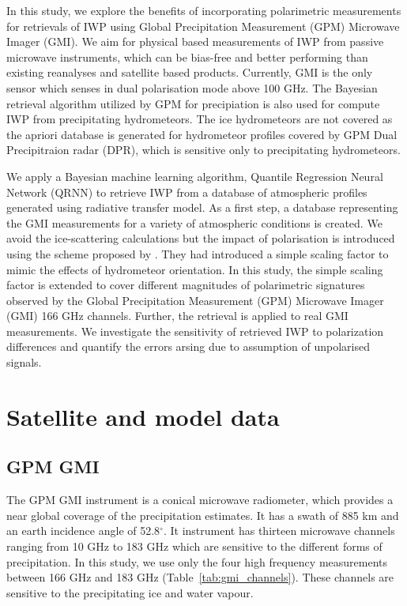 \documentclass[amt, manuscript]{copernicus}
\begin{document}
In this study, we explore the benefits of incorporating polarimetric measurements for retrievals of IWP using Global Precipitation Measurement (GPM) Microwave Imager (GMI). We aim for physical based measurements of IWP from passive microwave instruments, which can be bias-free and better performing than existing reanalyses and satellite based products. Currently, GMI is the only sensor which senses in dual polarisation mode above 100\,\,GHz. The Bayesian retrieval algorithm utilized by GPM for precipiation is also used for compute IWP from precipitating hydrometeors. The ice hydrometeors are not covered as the apriori database is generated for hydrometeor profiles covered by GPM Dual Precipitraion radar (DPR), which is sensitive only to precipitating hydrometeors. 

We apply a Bayesian machine learning algorithm, Quantile Regression Neural Network (QRNN) \citep{pfreundschuh:aneur:18} to retrieve IWP from a database of atmospheric profiles generated using radiative transfer model. As a first step, a database representing the GMI measurements for a variety of atmospheric conditions is created. We avoid the ice-scattering calculations but the impact of polarisation is introduced using the scheme proposed by \citet{barlakas:intro:21}. They had introduced a simple scaling factor to mimic the effects of hydrometeor orientation. In this study, the simple scaling factor is extended to cover different magnitudes of polarimetric signatures observed by the Global Precipitation Measurement (GPM) Microwave Imager (GMI) 166 GHz channels. Further, the retrieval is applied to real GMI measurements. We investigate the sensitivity of retrieved IWP to polarization differences and  quantify the errors arsing due to assumption of unpolarised signals. 

\section{Satellite and model data}

\subsection{GPM GMI}
The GPM GMI instrument is a conical microwave radiometer, which provides a near global coverage of the precipitation estimates. It has a swath of 885\,\,km  and an earth incidence angle of 52.8$^{\circ}$. It instrument has thirteen microwave channels ranging from 10\,\,GHz to 183\,\,GHz which are sensitive to the different forms of precipitation. In this study, we use only the four high frequency measurements between 166 GHz and 183 GHz (Table~\ref{tab:gmi_channels}). These channels are sensitive to the precipitating ice and water vapour.
\end{document}

